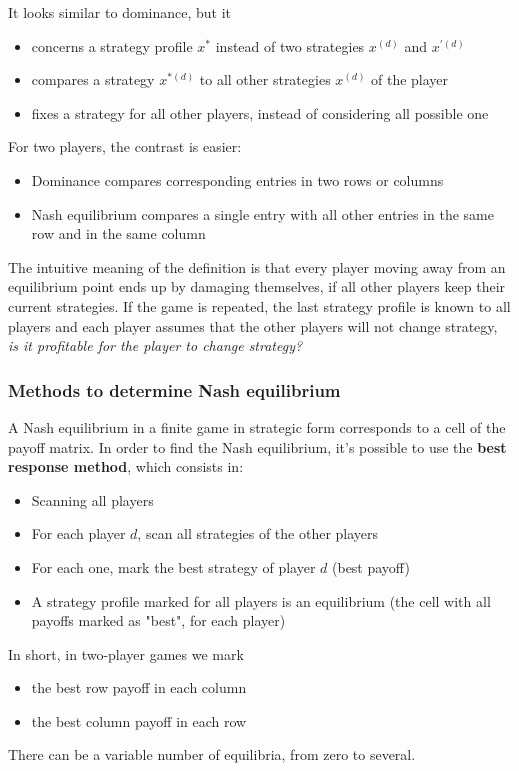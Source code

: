 It looks similar to dominance, but it
\begin{itemize}
	\item concerns a strategy profile $x^\ast$ instead of two strategies $x^{(d)}$ and $x^{'(d)}$
	
	\item compares a strategy $x^{\ast (d)}$ to all other strategies $x^{(d)}$ of the player 
	
	\item fixes a strategy for all other players, instead of considering all possible one 
\end{itemize}

For two players, the contrast is easier: 
\begin{itemize}
	\item Dominance compares corresponding entries in two rows or columns
	
	\item Nash equilibrium compares a single entry with all other entries in the same row and in the same column
\end{itemize}

The intuitive meaning of the definition is that every player moving away from an equilibrium point ends up by damaging themselves, if all other players keep their current strategies. If the game is repeated, the last strategy profile is known to all players and each player assumes that the other players will not change strategy, \textit{is it profitable for the player to change strategy?}

\subsubsection{Methods to determine Nash equilibrium}

A Nash equilibrium in a finite game in strategic form corresponds to a cell of the payoff matrix. In order to find the Nash equilibrium, it's possible to use the \textbf{best response method}, which consists in:
\begin{itemize}
	\item Scanning all players 
	
	\item For each player $d$, scan all strategies of the other players 
	
	\item For each one, mark the best strategy of player $d$ (best payoff)
	
	\item A strategy profile marked for all players is an equilibrium (the cell with all payoffs marked as "best", for each player)
\end{itemize}

In short, in two-player games we mark
\begin{itemize}
	\item the best row payoff in each column
	
	\item the best column payoff in each row
\end{itemize}

There can be a variable number of equilibria, from zero to several.

